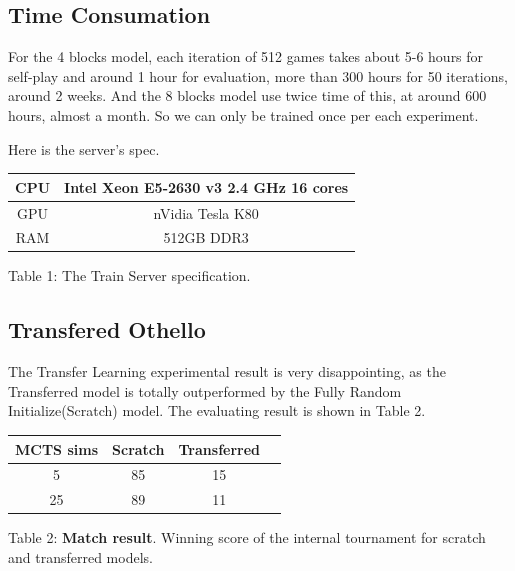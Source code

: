 \documentclass[12pt,a4paper]{article}
\begin{document}
\subsection{Time Consumation}
\hspace{0.6cm} For the 4 blocks model, each iteration of 512 games takes about 5-6 hours for self-play and around 1 hour for evaluation, more than 300 hours for 50 iterations, around 2 weeks. And the 8 blocks model use twice time of this, at around 600 hours, almost a month. So we can only be trained once per each experiment.\par
Here is the server's spec.
{
\begin{center}
\begin{tabular}{ |c|c| }
\hline
CPU & Intel Xeon E5-2630 v3 2.4 GHz 16 cores \\
\hline
GPU & nVidia Tesla K80  \\
\hline
RAM & 512GB DDR3  \\
\hline
\end{tabular}\par
\begin{small}
Table 1: The Train Server specification.
\end{small}
\end{center}
}
\subsection{Transfered Othello}
\hspace{0.6cm}The Transfer Learning experimental result is very disappointing, as the Transferred model is totally outperformed by the Fully Random Initialize(Scratch) model. The evaluating result is shown in Table 2.
{
\begin{center}
\begin{tabular}{ |c|c|c|c| }
\hline
MCTS sims & Scratch & Transferred \\
\hline
5         & 85      & 15           \\
\hline
25        & 89      & 11           \\
\hline
\end{tabular}\par
\begin{small}
Table 2: \textbf{Match result}. Winning score of the internal tournament for scratch and transferred models.
\end{small}
\end{center}
}
\end{document}
